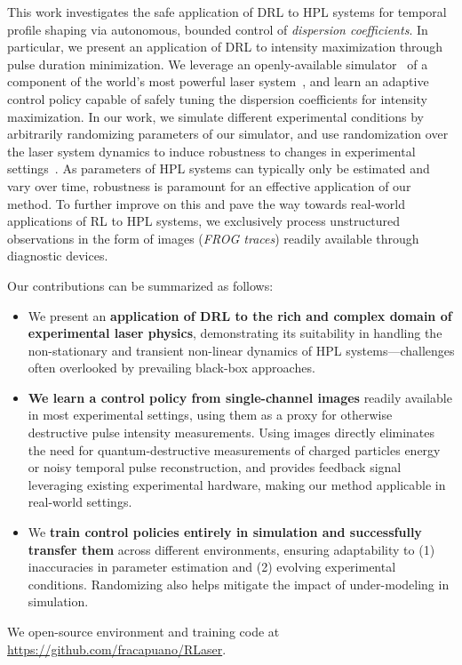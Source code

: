 This work investigates the safe application of DRL to HPL systems for temporal profile shaping via autonomous, bounded control of \textit{dispersion coefficients}. 
In particular, we present an application of DRL to intensity maximization through pulse duration minimization. 
We leverage an openly-available simulator~\citep{capuano2023temporl} of a component of the world's most powerful laser system~\citep{batysta2014pulse}, and learn an adaptive control policy capable of safely tuning the dispersion coefficients for intensity maximization. 
In our work, we simulate different experimental conditions by arbitrarily randomizing parameters of our simulator, and use randomization over the laser system dynamics to induce robustness to changes in experimental settings~\citep{tiboni2023domain}.
As parameters of HPL systems can typically only be estimated and vary over time, robustness is paramount for an effective application of our method. To further improve on this and pave the way towards real-world applications of RL to HPL systems, we exclusively process unstructured observations in the form of images (\textit{FROG traces}) readily available through diagnostic devices. 

Our contributions can be summarized as follows:
\begin{itemize}
    \item We present an \textbf{application of DRL to the rich and complex domain of experimental laser physics}, demonstrating its suitability in handling the non-stationary and transient non-linear dynamics of HPL systems---challenges often overlooked by prevailing black-box approaches.
    \item \textbf{We learn a control policy from single-channel images} readily available in most experimental settings, using them as a proxy for otherwise destructive pulse intensity measurements. Using images directly eliminates the need for quantum-destructive measurements of charged particles energy or noisy temporal pulse reconstruction, and provides feedback signal leveraging existing experimental hardware, making our method applicable in real-world settings.
    \item We \textbf{train control policies entirely in simulation and successfully transfer them} across different environments, ensuring adaptability to (1) inaccuracies in parameter estimation and (2) evolving experimental conditions. Randomizing also helps mitigate the impact of under-modeling in simulation.
\end{itemize}

We open-source environment and training code at \url{https://github.com/fracapuano/RLaser}.
